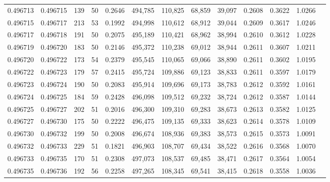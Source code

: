 \begin{tabular}{rrrrrrrrrrrrr}
0.496713 & 0.496715 &   139 &  50 &                                     0.2646 & 494,785 & 110,825 &  68,859 &  39,097 & 0.2608 & 0.3622 & 1.0266 \\
0.496715 & 0.496717 &   213 &  53 &                                     0.1992 & 494,998 & 110,612 &  68,912 &  39,044 & 0.2609 & 0.3617 & 1.0246 \\
0.496717 & 0.496718 &   191 &  50 &                                     0.2075 & 495,189 & 110,421 &  68,962 &  38,994 & 0.2610 & 0.3612 & 1.0228 \\
0.496719 & 0.496720 &   183 &  50 &                                     0.2146 & 495,372 & 110,238 &  69,012 &  38,944 & 0.2611 & 0.3607 & 1.0211 \\
0.496720 & 0.496722 &   173 &  54 &                                     0.2379 & 495,545 & 110,065 &  69,066 &  38,890 & 0.2611 & 0.3602 & 1.0195 \\
0.496722 & 0.496723 &   179 &  57 &                                     0.2415 & 495,724 & 109,886 &  69,123 &  38,833 & 0.2611 & 0.3597 & 1.0179 \\
0.496723 & 0.496724 &   190 &  50 &                                     0.2083 & 495,914 & 109,696 &  69,173 &  38,783 & 0.2612 & 0.3592 & 1.0161 \\
0.496724 & 0.496725 &   184 &  59 &                                     0.2428 & 496,098 & 109,512 &  69,232 &  38,724 & 0.2612 & 0.3587 & 1.0144 \\
0.496725 & 0.496727 &   202 &  51 &                                     0.2016 & 496,300 & 109,310 &  69,283 &  38,673 & 0.2613 & 0.3582 & 1.0125 \\
0.496727 & 0.496730 &   175 &  50 &                                     0.2222 & 496,475 & 109,135 &  69,333 &  38,623 & 0.2614 & 0.3578 & 1.0109 \\
0.496730 & 0.496732 &   199 &  50 &                                     0.2008 & 496,674 & 108,936 &  69,383 &  38,573 & 0.2615 & 0.3573 & 1.0091 \\
0.496732 & 0.496733 &   229 &  51 &                                     0.1821 & 496,903 & 108,707 &  69,434 &  38,522 & 0.2616 & 0.3568 & 1.0070 \\
0.496733 & 0.496735 &   170 &  51 &                                     0.2308 & 497,073 & 108,537 &  69,485 &  38,471 & 0.2617 & 0.3564 & 1.0054 \\
0.496735 & 0.496736 &   192 &  56 &                                     0.2258 & 497,265 & 108,345 &  69,541 &  38,415 & 0.2618 & 0.3558 & 1.0036 \\

\end{tabular}
